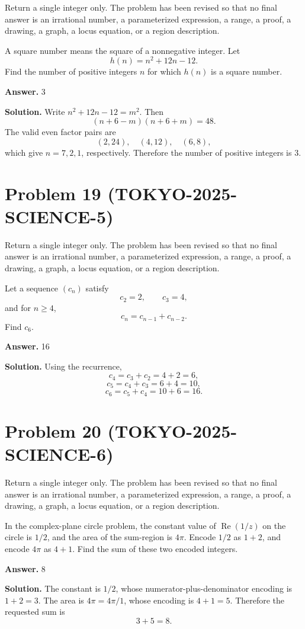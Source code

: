 \documentclass[11pt]{article}
\begin{document}
Return a single integer only. The problem has been revised so that no final answer is an irrational number, a parameterized expression, a range, a proof, a drawing, a graph, a locus equation, or a region description.

A square number means the square of a nonnegative integer. Let
\[
h(n)=n^2+12n-12.
\]
Find the number of positive integers \(n\) for which \(h(n)\) is a square number.


\textbf{Answer.} 3


\textbf{Solution.}
Write \(n^2+12n-12=m^2\). Then
\[
(n+6-m)(n+6+m)=48.
\]
The valid even factor pairs are
\[
(2,24),\quad (4,12),\quad (6,8),
\]
which give \(n=7,2,1\), respectively. Therefore the number of positive integers
is \(3\).


\section*{Problem 19 (TOKYO-2025-SCIENCE-5)}

Return a single integer only. The problem has been revised so that no final answer is an irrational number, a parameterized expression, a range, a proof, a drawing, a graph, a locus equation, or a region description.

Let a sequence \((c_n)\) satisfy
\[
c_2=2,\qquad c_3=4,
\]
and for \(n\ge4\),
\[
c_n=c_{n-1}+c_{n-2}.
\]
Find \(c_6\).


\textbf{Answer.} 16


\textbf{Solution.}
Using the recurrence,
\[
c_4=c_3+c_2=4+2=6,
\]
\[
c_5=c_4+c_3=6+4=10,
\]
\[
c_6=c_5+c_4=10+6=16.
\]


\section*{Problem 20 (TOKYO-2025-SCIENCE-6)}

Return a single integer only. The problem has been revised so that no final answer is an irrational number, a parameterized expression, a range, a proof, a drawing, a graph, a locus equation, or a region description.

In the complex-plane circle problem, the constant value of \(\operatorname{Re}(1/z)\)
on the circle is \(1/2\), and the area of the sum-region is \(4\pi\). Encode
\(1/2\) as \(1+2\), and encode \(4\pi\) as \(4+1\). Find the sum of these two
encoded integers.


\textbf{Answer.} 8


\textbf{Solution.}
The constant is \(1/2\), whose numerator-plus-denominator encoding is
\(1+2=3\). The area is \(4\pi=4\pi/1\), whose encoding is \(4+1=5\). Therefore
the requested sum is
\[
3+5=8.
\]
\end{document}
